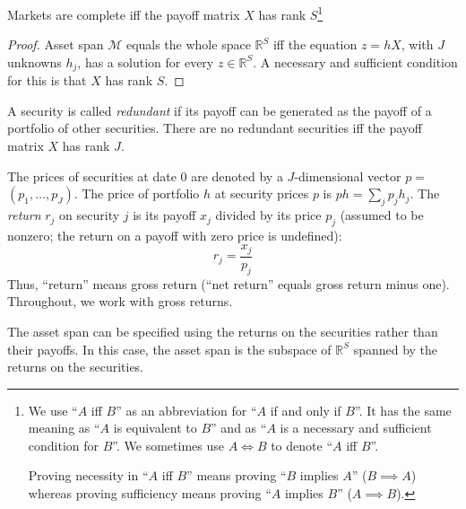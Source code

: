 \documentclass[\topdir/lecture\_notes.tex]{subfiles}
\begin{document}
\begin{theorem}\label{thm:market_completeness}
Markets are complete iff the payoff matrix $X$ has rank $S$\footnote{We use ``$A$ iff $B$'' as an abbreviation for ``$A$ if and only if $B$''. It has the same meaning as ``$A$ is equivalent to $B$'' and as ``$A$ is a necessary and sufficient condition for $B$''. We sometimes use $A \iff B$ to denote ``$A$ iff $B$''.

Proving necessity in ``$A$ iff $B$'' means proving ``$B$ implies $A$'' ($B \implies A$) whereas proving sufficiency means proving ``$A$ implies $B$'' ($A \implies B$).
}
\end{theorem}
\begin{proof}
Asset span $\mathcal{M}$ equals the whole space $\mathbb{R}^{S}$ iff the equation $z=h X$, with $J$ unknowns $h_{j}$, has a solution for every $z \in \mathbb{R}^{S}$. A necessary and sufficient condition for this is that $X$ has rank $S$.
\end{proof}

A security is called \emph{redundant} if its payoff can be generated as the payoff of a portfolio of other securities. There are no redundant securities iff the payoff matrix $X$ has rank $J$.

The prices of securities at date $0$ are denoted by a $J$-dimensional vector $p=$ $\left(p_{1}, \ldots, p_{J}\right)$. The price of portfolio $h$ at security prices $p$ is $p h=\sum_{j} p_{j} h_{j}$. The \emph{return} $r_{j}$ on security $j$ is its payoff $x_{j}$ divided by its price $p_{j}$ (assumed to be nonzero; the return on a payoff with zero price is undefined):
\begin{equation*}
r_{j}=\frac{x_{j}}{p_{j}} 
\end{equation*}
Thus, ``return'' means gross return (``net return'' equals gross return minus one). Throughout, we work with gross returns.

The asset span can be specified using the returns on the securities rather than their payoffs. In this case, the asset span is the subspace of $\mathbb{R}^{S}$ spanned by the returns on the securities.
\end{document}
